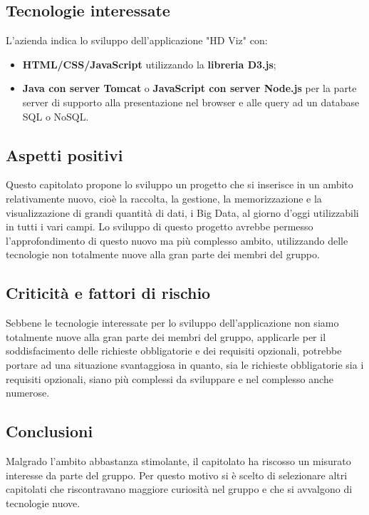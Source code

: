 \subsection{Tecnologie interessate}
L'azienda indica lo sviluppo dell'applicazione "HD Viz" con:
\begin{itemize}
\item \textbf{HTML/CSS/JavaScript} utilizzando la \textbf{libreria D3.js};
\item \textbf{Java con server Tomcat} o \textbf{JavaScript con server Node.js} per la parte server di supporto alla presentazione nel browser e alle query ad un database SQL o NoSQL.
\end{itemize}
\subsection{Aspetti positivi}
Questo capitolato propone lo sviluppo un progetto che si inserisce in un ambito relativamente nuovo, cioè la raccolta, la gestione, la memorizzazione e la visualizzazione di grandi quantità di dati, i Big Data, al giorno d'oggi utilizzabili in tutti i vari campi.
Lo sviluppo di questo progetto avrebbe permesso l'approfondimento di questo nuovo ma più complesso ambito, utilizzando delle tecnologie non totalmente nuove alla gran parte dei membri del gruppo.  
\subsection{Criticità e fattori di rischio}
Sebbene le tecnologie interessate per lo sviluppo dell'applicazione non siamo totalmente nuove alla gran parte dei membri del gruppo, applicarle per il soddisfacimento delle richieste obbligatorie e dei requisiti opzionali, potrebbe portare ad una situazione svantaggiosa in quanto, sia le richieste obbligatorie sia i requisiti opzionali, siano più complessi da sviluppare e nel complesso anche numerose.
\subsection{Conclusioni}
Malgrado l'ambito abbastanza stimolante, il capitolato ha riscosso un misurato interesse da parte del gruppo. 
Per questo motivo si è scelto di selezionare altri capitolati che riscontravano maggiore curiosità nel gruppo e che si avvalgono di tecnologie nuove.